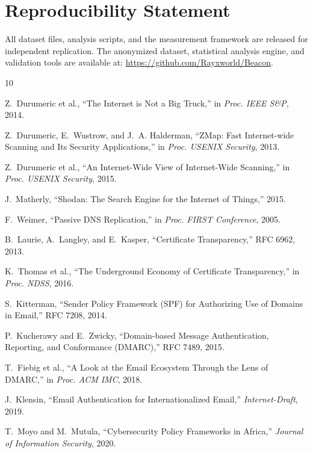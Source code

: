 \documentclass[conference]{IEEEtran}
\begin{document}
\section*{Reproducibility Statement}

All dataset files, analysis scripts, and the measurement framework are released for independent replication. The anonymized dataset, statistical analysis engine, and validation tools are available at: \url{https://github.com/Rayxworld/Beacon}.

\begin{thebibliography}{10}

Z.~Durumeric et al., ``The Internet is Not a Big Truck,'' in \textit{Proc. IEEE S\&P}, 2014.

Z.~Durumeric, E.~Wustrow, and J.~A. Halderman, ``ZMap: Fast Internet-wide Scanning and Its Security Applications,'' in \textit{Proc. USENIX Security}, 2013.

Z.~Durumeric et al., ``An Internet-Wide View of Internet-Wide Scanning,'' in \textit{Proc. USENIX Security}, 2015.

J.~Matherly, ``Shodan: The Search Engine for the Internet of Things,'' 2015.

F.~Weimer, ``Passive DNS Replication,'' in \textit{Proc. FIRST Conference}, 2005.

B.~Laurie, A.~Langley, and E.~Kasper, ``Certificate Transparency,'' RFC 6962, 2013.

K.~Thomas et al., ``The Underground Economy of Certificate Transparency,'' in \textit{Proc. NDSS}, 2016.

S.~Kitterman, ``Sender Policy Framework (SPF) for Authorizing Use of Domains in Email,'' RFC 7208, 2014.

P.~Kucherawy and E.~Zwicky, ``Domain-based Message Authentication, Reporting, and Conformance (DMARC),'' RFC 7489, 2015.

T.~Fiebig et al., ``A Look at the Email Ecosystem Through the Lens of DMARC,'' in \textit{Proc. ACM IMC}, 2018.

J.~Klensin, ``Email Authentication for Internationalized Email,'' \textit{Internet-Draft}, 2019.

T.~Moyo and M.~Mutula, ``Cybersecurity Policy Frameworks in Africa,'' \textit{Journal of Information Security}, 2020.


\end{thebibliography}
\end{document}
